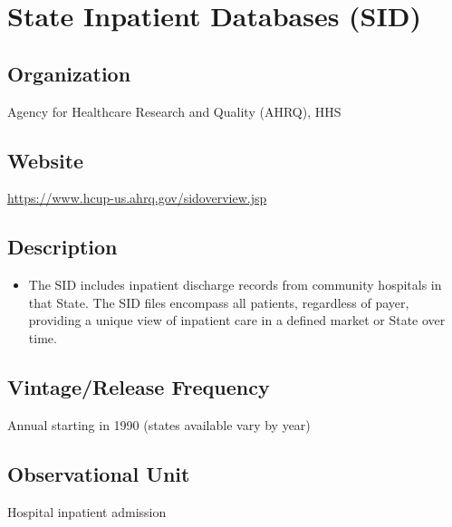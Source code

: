 \documentclass[
]{book}
\providecommand{\tightlist}{%
  \setlength{\itemsep}{0pt}\setlength{\parskip}{0pt}}
\begin{document}
\mainmatter

\hypertarget{state-inpatient-databases-sid}{%
\chapter{State Inpatient Databases (SID)}\label{state-inpatient-databases-sid}}

\hypertarget{organization-84}{%
\section{Organization}\label{organization-84}}

Agency for Healthcare Research and Quality (AHRQ), HHS

\hypertarget{website-84}{%
\section{Website}\label{website-84}}

\url{https://www.hcup-us.ahrq.gov/sidoverview.jsp}

\hypertarget{description-84}{%
\section{Description}\label{description-84}}

\begin{itemize}
\tightlist
\item
  The SID includes inpatient discharge records from community hospitals in that State. The SID files encompass all patients, regardless of payer, providing a unique view of inpatient care in a defined market or State over time.
\end{itemize}

\hypertarget{vintagerelease-frequency-84}{%
\section{Vintage/Release Frequency}\label{vintagerelease-frequency-84}}

Annual starting in 1990 (states available vary by year)

\hypertarget{observational-unit-84}{%
\section{Observational Unit}\label{observational-unit-84}}

Hospital inpatient admission
\end{document}
